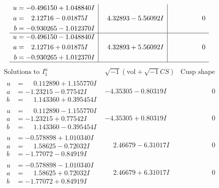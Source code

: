 \documentclass[1p]{elsarticle_modified}
\theoremstyle{definition}
\newcommand{\I}{\sqrt{-1}}
\begin{document}
$$\begin{array}{c|c|c}
\begin{aligned}
u &= -0.496150 + 1.048840 I \\
a &= \phantom{-}2.12716 - 0.01875 I \\
b &= -0.930265 - 1.012370 I\end{aligned}
 & \phantom{-}4.32893 - 5.56092 I & \phantom{-0.000000 } 0 \\ \hline\begin{aligned}
u &= -0.496150 - 1.048840 I \\
a &= \phantom{-}2.12716 + 0.01875 I \\
b &= -0.930265 + 1.012370 I\end{aligned}
 & \phantom{-}4.32893 + 5.56092 I & \phantom{-0.000000 } 0\\
 \hline 
 \end{array}$$\newpage$$\begin{array}{c|c|c}  
\text{Solutions to }I^u_{1}& \I (\text{vol} + \sqrt{-1}CS) & \text{Cusp shape}\\
 \hline 
\begin{aligned}
u &= \phantom{-}0.112890 + 1.155770 I \\
a &= -1.23215 - 0.77542 I \\
b &= \phantom{-}1.143360 + 0.395454 I\end{aligned}
 & -4.35305 - 0.80319 I & \phantom{-0.000000 } 0 \\ \hline\begin{aligned}
u &= \phantom{-}0.112890 - 1.155770 I \\
a &= -1.23215 + 0.77542 I \\
b &= \phantom{-}1.143360 - 0.395454 I\end{aligned}
 & -4.35305 + 0.80319 I & \phantom{-0.000000 } 0 \\ \hline\begin{aligned}
u &= -0.578898 + 1.010340 I \\
a &= \phantom{-}1.58625 - 0.72032 I \\
b &= -1.77072 - 0.84919 I\end{aligned}
 & \phantom{-}2.46679 - 6.31017 I & \phantom{-0.000000 } 0 \\ \hline\begin{aligned}
u &= -0.578898 - 1.010340 I \\
a &= \phantom{-}1.58625 + 0.72032 I \\
b &= -1.77072 + 0.84919 I\end{aligned}
 & \phantom{-}2.46679 + 6.31017 I & \phantom{-0.000000 } 0 \\ \hline\begin{aligned}

\end{aligned}
\end{array}$$
\end{document}
